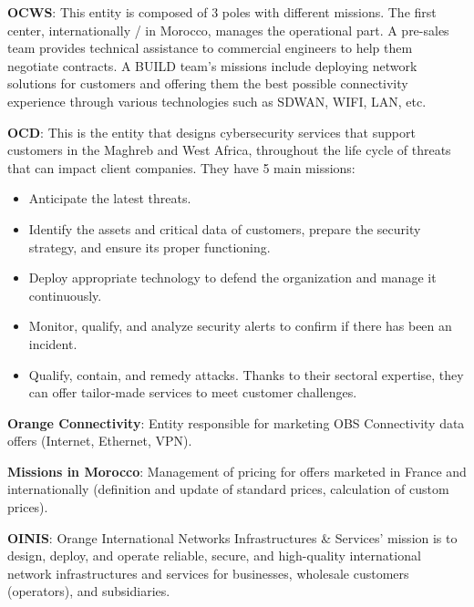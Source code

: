 \textbf{OCWS}: This entity is composed of 3 poles with different missions. The first center, internationally / in Morocco, manages the operational part. A pre-sales team provides technical assistance to commercial engineers to help them negotiate contracts. A BUILD team's missions include deploying network solutions for customers and offering them the best possible connectivity experience through various technologies such as SDWAN, WIFI, LAN, etc.

\vspace{10pt} 

\textbf{OCD}: This is the entity that designs cybersecurity services that support customers in the Maghreb and West Africa, throughout the life cycle of threats that can impact client companies. They have 5 main missions:
  
  \begin{itemize}
  \item Anticipate the latest threats.
  \item Identify the assets and critical data of customers, prepare the security strategy, and ensure its proper functioning.
  \item Deploy appropriate technology to defend the organization and manage it continuously.
  \item Monitor, qualify, and analyze security alerts to confirm if there has been an incident.
  \item Qualify, contain, and remedy attacks. Thanks to their sectoral expertise, they can offer tailor-made services to meet customer challenges.
  \end{itemize}
  
  \textbf{Orange Connectivity}: Entity responsible for marketing OBS Connectivity data offers (Internet, Ethernet, VPN).
  
  \vspace{10pt} 

  \textbf{Missions in Morocco}: Management of pricing for offers marketed in France and internationally (definition and update of standard prices, calculation of custom prices).
  
  \vspace{10pt} 

  \textbf{OINIS}: Orange International Networks Infrastructures \& Services' mission is to design, deploy, and operate reliable, secure, and high-quality international network infrastructures and services for businesses, wholesale customers (operators), and subsidiaries.


